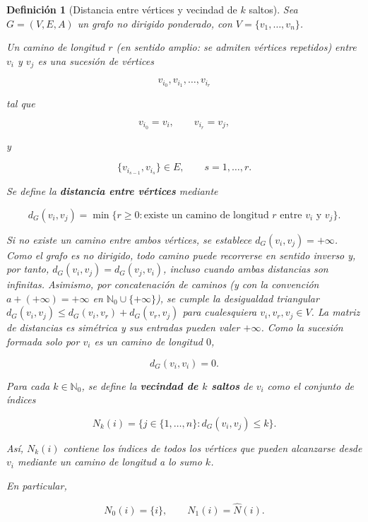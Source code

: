 \documentclass[a4paper,openany,oneside,10pt]{report}
\theoremstyle{pnlTeorema}
\theoremstyle{pnlDefinicion}
\newtheorem{definicion}{Definición}[section]
\theoremstyle{pnlObservacion}
\begin{document}
\begin{definicion}[Distancia entre vértices y vecindad de $k$ saltos]\label{def:distancia-saltos}
Sea \(G=(V,E,A)\) un grafo no dirigido ponderado, con \(V=\{v_1,\ldots,v_n\}\).

Un \emph{camino de longitud \(r\)} (en sentido amplio: se admiten vértices repetidos) entre \(v_i\) y \(v_j\) es una sucesión de vértices

\[
v_{i_0},v_{i_1},\ldots,v_{i_r}
\]

tal que

\[
v_{i_0}=v_i,\qquad v_{i_r}=v_j,
\]

y

\[
\{v_{i_{s-1}},v_{i_s}\}\in E,
\qquad s=1,\ldots,r.
\]

Se define la \textbf{distancia entre vértices} mediante

\[
d_G(v_i,v_j)=
\min\{r\ge0:\text{existe un camino de longitud }r
\text{ entre }v_i\text{ y }v_j\}.
\]

Si no existe un camino entre ambos vértices, se establece \(d_G(v_i,v_j)=+\infty\). Como el grafo es no dirigido, todo camino puede recorrerse en sentido inverso y, por tanto, \(d_G(v_i,v_j)=d_G(v_j,v_i)\), incluso cuando ambas distancias son infinitas. Asimismo, por concatenación de caminos (y con la convención \(a+(+\infty)=+\infty\) en \(\mathbb N_0\cup\{+\infty\}\)), se cumple la desigualdad triangular \(d_G(v_i,v_j)\le d_G(v_i,v_r)+d_G(v_r,v_j)\) para cualesquiera \(v_i,v_r,v_j\in V\). La matriz de distancias es simétrica y sus entradas pueden valer \(+\infty\). Como la sucesión formada solo por $v_i$ es un camino de longitud $0$,

\[
d_G(v_i,v_i)=0.
\]

Para cada \(k\in\mathbb N_0\), se define la \textbf{vecindad de \(k\) saltos} de \(v_i\) como el conjunto de índices

\[
N_k(i)=\{j\in\{1,\ldots,n\}:d_G(v_i,v_j)\le k\}.
\]

Así, \(N_k(i)\) contiene los índices de todos los vértices que pueden alcanzarse desde \(v_i\) mediante un camino de longitud a lo sumo \(k\).

En particular,

\[
N_0(i)=\{i\},
\qquad
N_1(i)=\widehat N(i).
\]
\end{definicion}
\end{document}
